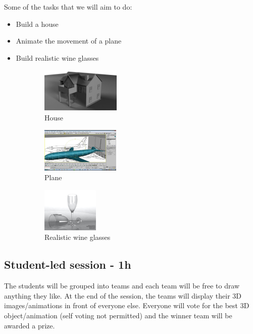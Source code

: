 \documentclass[11pt,a4paper]{article}
\begin{document}
Some of the tasks that we will aim to do:
\begin{itemize}
 \item Build a house
 \item Animate the movement of a plane
 \item Build realistic wine glasses
\end{itemize}

\begin{figure}[H]
 \begin{subfigure}{0.3\textwidth}
 \centering
  \includegraphics[height=80px]{images/house.jpg}
  \caption{House}
 \end{subfigure}
 \begin{subfigure}{0.3\textwidth}
 \centering
  \includegraphics[height=80px, trim=0 0 200 0, clip]{images/plane.jpg}
  \caption{Plane}
 \end{subfigure}
 \begin{subfigure}{0.3\textwidth}
 \centering
  \includegraphics[height=80px]{images/glass03.jpg}
  \caption{Realistic wine glasses}
 \end{subfigure}
 \caption{}
\end{figure}



\subsection{Student-led session - 1h}

The students will be grouped into teams and each team will be free to draw anything they like. At the end of the session, the teams will display their 3D images/animations in front of everyone else. Everyone will vote for the best 3D object/animation (self voting not permitted) and the winner team will be awarded a prize.
\end{document}
